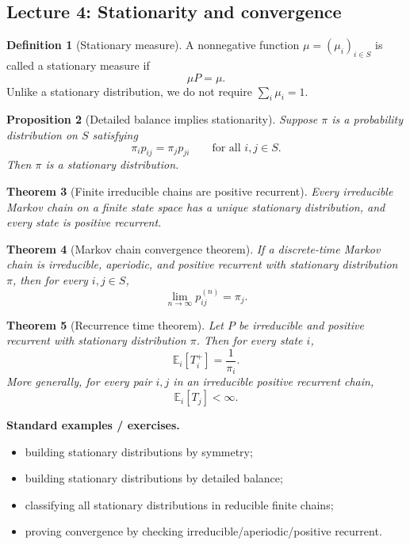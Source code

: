 \documentclass[11pt]{article}
\newtheorem{theorem}{Theorem}[section]
\newtheorem{proposition}[theorem]{Proposition}
\theoremstyle{definition}
\newtheorem{definition}[theorem]{Definition}
\begin{document}
\subsection{Lecture 4: Stationarity and convergence}

\begin{definition}[Stationary measure]
A nonnegative function $\mu=(\mu_i)_{i\in S}$ is called a stationary measure if
\[
\mu P = \mu.
\]
Unlike a stationary distribution, we do not require $\sum_i \mu_i=1$.
\end{definition}

\begin{proposition}[Detailed balance implies stationarity]
Suppose $\pi$ is a probability distribution on $S$ satisfying
\[
\pi_i p_{ij}=\pi_j p_{ji}
\qquad \text{for all } i,j\in S.
\]
Then $\pi$ is a stationary distribution.
\end{proposition}

\begin{theorem}[Finite irreducible chains are positive recurrent]
Every irreducible Markov chain on a finite state space has a unique stationary distribution, and every state is positive recurrent.
\end{theorem}

\begin{theorem}[Markov chain convergence theorem]
If a discrete-time Markov chain is irreducible, aperiodic, and positive recurrent with stationary distribution $\pi$, then for every $i,j\in S$,
\[
\lim_{n\to\infty} p_{ij}^{(n)} = \pi_j.
\]
\end{theorem}

\begin{theorem}[Recurrence time theorem]
Let $P$ be irreducible and positive recurrent with stationary distribution $\pi$. Then for every state $i$,
\[
\mathbb E_i[T_i^+] = \frac{1}{\pi_i}.
\]
More generally, for every pair $i,j$ in an irreducible positive recurrent chain,
\[
\mathbb E_i[T_j] < \infty.
\]
\end{theorem}

\textbf{Standard examples / exercises.}
\begin{itemize}[leftmargin=2em]
    \item building stationary distributions by symmetry;
    \item building stationary distributions by detailed balance;
    \item classifying all stationary distributions in reducible finite chains;
    \item proving convergence by checking irreducible/aperiodic/positive recurrent.
\end{itemize}
\end{document}
